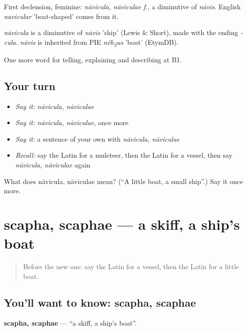 First declension, feminine: \emph{nāvicula, nāviculae f.}, a diminutive of \emph{nāvis}. English \emph{navicular} 'boat-shaped' comes from it.

\begin{cousinweb}
\emph{nāvicula} is a diminutive of \emph{nāvis} 'ship' (Lewis \& Short), made with the ending \emph{-cula}. \emph{nāvis} is inherited from PIE \emph{néh\textsubscript{2}us} 'boat' (EtymDB).
\end{cousinweb}

\begin{grammarlens}[title={What you've built}]
One more word for telling, explaining and describing at B1.
\end{grammarlens}

\subsection*{Your turn}
\begin{itemize}
\raggedright
  \item \emph{Say it:} \emph{nāvicula, nāviculae}
  \item \emph{Say it:} \emph{nāvicula, nāviculae}, once more
  \item \emph{Say it:} a sentence of your own with \emph{nāvicula, nāviculae}
  \item \emph{Recall:} say the Latin for a muleteer, then the Latin for a vessel, then say \emph{nāvicula, nāviculae} again
\end{itemize}

\begin{tcolorbox}[breakable,colback=teal!4,colframe=teal!35!black,title={Before you move on}]
What does nāvicula, nāviculae mean? (\textquotedblleft{}A little boat, a small ship\textquotedblright{}.) Say it once more.
\end{tcolorbox}
\section[scapha, scaphae]{scapha, scaphae — a skiff, a ship's boat}

\label{lesson:LA-C435-scapha}



\begin{quote}
Before the new one: say the Latin for a vessel, then the Latin for a little boat.
\end{quote}

\subsection*{You'll want to know: scapha, scaphae}
\textbf{scapha, scaphae} — \textquotedblleft{}a skiff, a ship's boat\textquotedblright{}.


